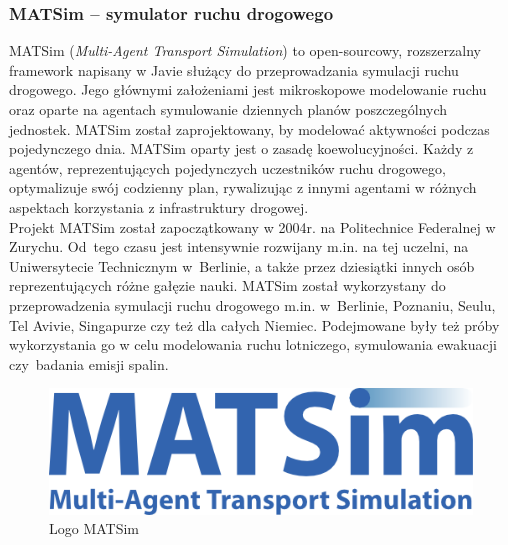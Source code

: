 \subsubsection{MATSim -- symulator ruchu drogowego}
MATSim (\textit{Multi-Agent Transport Simulation}) to open-sourcowy, rozszerzalny framework napisany w Javie służący do przeprowadzania symulacji ruchu drogowego. Jego głównymi założeniami jest mikroskopowe modelowanie ruchu oraz oparte na agentach symulowanie dziennych planów poszczególnych jednostek\cite{matsim}. MATSim został zaprojektowany, by modelować aktywności podczas pojedynczego dnia. MATSim oparty jest o zasadę koewolucyjności. Każdy z agentów, reprezentujących pojedynczych uczestników ruchu drogowego, optymalizuje swój codzienny plan, rywalizując z innymi agentami w różnych aspektach korzystania z infrastruktury drogowej.\\
Projekt MATSim został zapoczątkowany w 2004r. na Politechnice Federalnej w Zurychu. Od~tego czasu jest intensywnie rozwijany m.in. na tej uczelni, na Uniwersytecie Technicznym w~Berlinie, a także przez dziesiątki innych osób reprezentujących różne gałęzie nauki. MATSim został wykorzystany do przeprowadzenia symulacji ruchu drogowego m.in. w~Berlinie, Poznaniu, Seulu, Tel Avivie, Singapurze czy też dla całych Niemiec. Podejmowane były też próby wykorzystania go w celu modelowania ruchu lotniczego, symulowania ewakuacji czy~badania emisji spalin.
    \begin{figure}[h]
        \caption{Logo MATSim}
        \includegraphics[width=\textwidth]{images/mopsim/matsim_logo.png}
    \end{figure}
